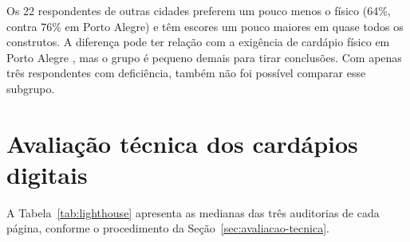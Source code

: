 Os 22 respondentes de outras cidades preferem um pouco menos o físico (64\%, contra 76\% em Porto Alegre) e têm escores um pouco maiores em quase todos os construtos. A diferença pode ter relação com a exigência de cardápio físico em Porto Alegre \cite{camarapoa2024cardapio}, mas o grupo é pequeno demais para tirar conclusões. Com apenas três respondentes com deficiência, também não foi possível comparar esse subgrupo.

\section{Avaliação técnica dos cardápios digitais}
\label{sec:res-avaliacao-tecnica}

A Tabela~\ref{tab:lighthouse} apresenta as medianas das três auditorias de cada página, conforme o procedimento da Seção~\ref{sec:avaliacao-tecnica}.

